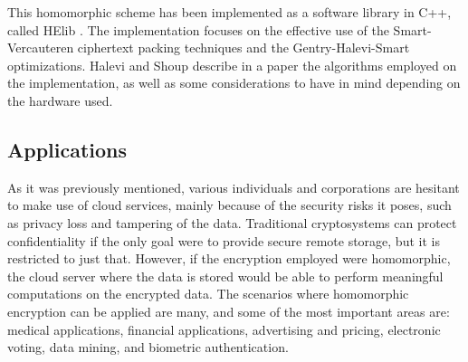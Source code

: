 This homomorphic scheme has been implemented as a software library in C++, called HElib \cite{helib}. The implementation focuses on the effective use of the Smart-Vercauteren ciphertext packing techniques and the Gentry-Halevi-Smart optimizations. Halevi and Shoup \cite{cryptoeprint:2014:106} describe in a paper the algorithms employed on the implementation, as well as some considerations to have in mind depending on the hardware used.

\subsection{Applications}

As it was previously mentioned, various individuals and corporations are hesitant to make use of cloud services, mainly because of the security risks it poses, such as privacy loss and tampering of the data. Traditional cryptosystems can protect confidentiality if the only goal were to provide secure remote storage, but it is restricted to just that. However, if the encryption employed were homomorphic, the cloud server where the data is stored would be able to perform meaningful computations on the encrypted data.  The scenarios where homomorphic encryption can be applied are many, and some of the most important areas are: medical applications, financial applications, advertising and pricing, electronic voting, data mining, and biometric authentication.

